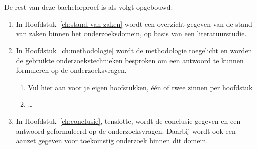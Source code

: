 \section{}%
\label{sec:Opzet-bachelorproef}


De rest van deze bachelorproef is als volgt opgebouwd:
\begin{enumerate}
  \item In Hoofdstuk~\ref{ch:stand-van-zaken} wordt een overzicht gegeven van de stand van zaken binnen het onderzoeksdomein, op basis van een literatuurstudie.
  \item In Hoofdstuk~\ref{ch:methodologie} wordt de methodologie toegelicht en worden de gebruikte onderzoekstechnieken besproken om een antwoord te kunnen formuleren op de onderzoeksvragen.
  \begin{enumerate}
    \item Vul hier aan voor je eigen hoofstukken, één of twee zinnen per hoofdstuk
    \item \dots
  \end{enumerate}
  \item In Hoofdstuk~\ref{ch:conclusie}, tenslotte, wordt de conclusie gegeven en een antwoord geformuleerd op de onderzoeksvragen. Daarbij wordt ook een aanzet gegeven voor toekomstig onderzoek binnen dit domein.
\end{enumerate}

